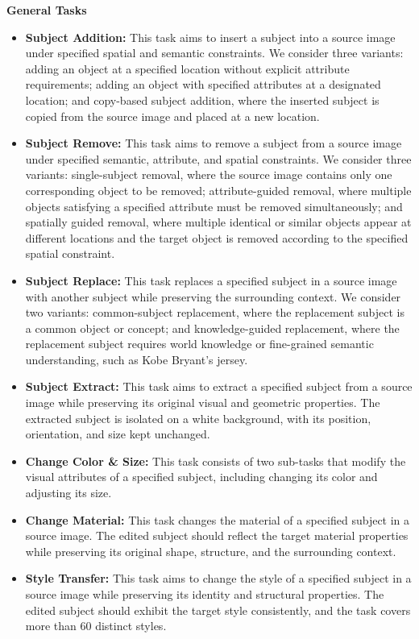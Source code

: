 \textbf{General Tasks}
\begin{itemize}[leftmargin=2.2em, labelsep=0.4em, itemsep=2pt]
    \item \textbf{Subject Addition:}  This task aims to insert a subject into a source image under specified spatial and semantic constraints. We consider three variants: adding an object at a specified location without explicit attribute requirements; adding an object with specified attributes at a designated location; and copy-based subject addition, where the inserted subject is copied from the source image and placed at a new location.
    \item \textbf{Subject Remove: } This task aims to remove a subject from a source image under specified semantic, attribute, and spatial constraints. We consider three variants: single-subject removal, where the source image contains only one corresponding object to be removed; attribute-guided removal, where multiple objects satisfying a specified attribute must be removed simultaneously; and spatially guided removal, where multiple identical or similar objects appear at different locations and the target object is removed according to the specified spatial constraint.
    \item \textbf{Subject Replace:} This task replaces a specified subject in a source image with another subject while preserving the surrounding context. We consider two variants: common-subject replacement, where the replacement subject is a common object or concept; and knowledge-guided replacement, where the replacement subject requires world knowledge or fine-grained semantic understanding, such as Kobe Bryant’s jersey.
    \item \textbf{Subject Extract: } This task aims to extract a specified subject from a source image while preserving its original visual and geometric properties. The extracted subject is isolated on a white background, with its position, orientation, and size kept unchanged.
    \item \textbf{Change Color \& Size: }  This task consists of two sub-tasks that modify the visual attributes of a specified subject, including changing its color and adjusting its size.
    \item \textbf{Change Material:} This task changes the material of a specified subject in a source image. The edited subject should reflect the target material properties while preserving its original shape, structure, and the surrounding context.
    \item \textbf{Style Transfer: }  This task aims to change the style of a specified subject in a source image while preserving its identity and structural properties. The edited subject should exhibit the target style consistently, and the task covers more than 60 distinct styles.

\end{itemize}
